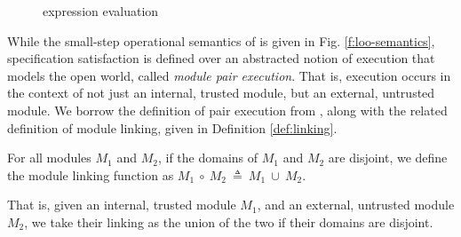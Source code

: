 \begin{figure}[t]
\begin{minipage}{\textwidth}
\begin{minipage}{\textwidth}
\caption{\Loo expression evaluation}
\label{f:evaluation}
\end{minipage}
\end{minipage}
\end{figure}

While the small-step operational semantics of \Loo is given in Fig. \ref{f:loo-semantics},
specification satisfaction is defined over an abstracted notion of 
execution that models the open world, called \emph{module pair execution}. 
That is, execution occurs in the context of not just an internal, trusted module, but 
an external, untrusted module. We borrow the definition of pair execution 
from \citeauthor{FASE}, along with the related definition of module linking, given in Definition \ref{def:linking}.
\begin{definition}
\label{def:linking}
For all modules $M_1$ and $M_2$, if the domains of $M_1$ and $M_2$ are disjoint, 
we define the module linking function as $M_1\ \circ\ M_2\ \triangleq\ M_1\ \cup\ M_2$.
\end{definition}
That is, given an internal, trusted module $M_1$, and an external, untrusted module $M_2$, 
we take their linking as the union of the two if their domains are disjoint.

